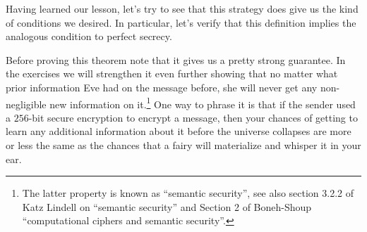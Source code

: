 Having learned our lesson, let's try to see that this strategy does give
us the kind of conditions we desired. In particular, let's verify that
this definition implies the analogous condition to perfect secrecy.

\hypertarget{twotomanycomp}{}

Before proving this theorem note that it gives us a pretty strong
guarantee. In the exercises we will strengthen it even further showing
that no matter what prior information Eve had on the message before, she
will never get any non-negligible new information on it.\footnote{The
  latter property is known as ``semantic security'', see also section
  3.2.2 of Katz Lindell on ``semantic security'' and Section 2 of
  Boneh-Shoup ``computational ciphers and semantic security''.} One way
to phrase it is that if the sender used a \(256\)-bit secure encryption
to encrypt a message, then your chances of getting to learn any
additional information about it before the universe collapses are more
or less the same as the chances that a fairy will materialize and
whisper it in your ear.


